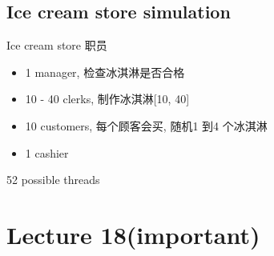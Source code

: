 \documentclass{article}
\begin{document}
\subsection{Ice cream store simulation}
Ice cream store 职员
\begin{itemize}
	\item 1 manager, 检查冰淇淋是否合格
	\item 10 - 40 clerks, 制作冰淇淋[10, 40]
	\item 10 customers, 每个顾客会买, 随机1 到4 个冰淇淋
	\item 1 cashier
\end{itemize}
52 possible threads

\section{Lecture 18(important)}
\end{document}
